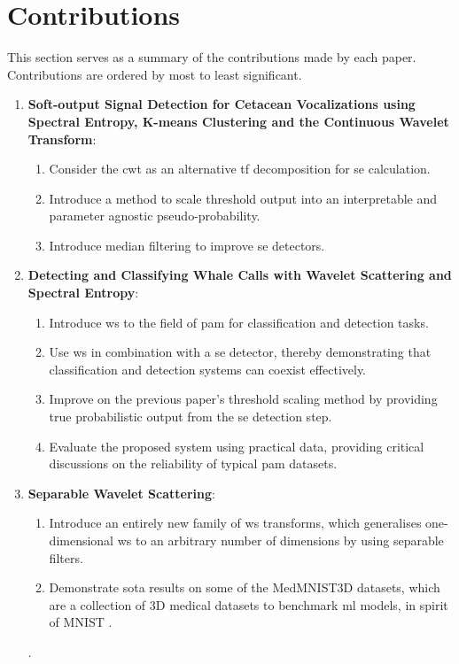\clearpage
\section{Contributions}
This section serves as a summary of the contributions made by each paper. Contributions are ordered by most to least significant.

\begin{enumerate}
    \item \textbf{Soft-output Signal Detection for Cetacean Vocalizations using Spectral Entropy, K-means Clustering and the Continuous Wavelet Trans\-form}:
    \begin{enumerate}
        \item Consider the \ac{cwt} as an alternative \ac{tf} decomposition for \ac{se} calculation.
        \item Introduce a method to scale threshold output into an interpretable and para\-meter agnostic pseudo-probability.
        \item Introduce median filtering to improve \ac{se} detectors.
    \end{enumerate}
    \item \textbf{Detecting and Classifying Whale Calls with Wavelet Scattering and Spec\-tral Entropy}:
    \begin{enumerate}
        \item Introduce \ac{ws} to the field of \ac{pam} for classification and detection tasks.
        \item Use \ac{ws} in combination with a \ac{se} detector, thereby demonstrating that classi\-fication and detection systems can coexist effectively.
        \item Improve on the previous paper's threshold scaling method by providing true proba\-bilistic output from the \ac{se} detection step.
        \item Evaluate the proposed system using practical data, providing critical discus\-sions on the reliability of typical \ac{pam} datasets. 
    \end{enumerate}
    \item \textbf{Separable Wavelet Scattering}: 
    \begin{enumerate}
        \item Introduce an entirely new family of \ac{ws} transforms, which generalises one-dimensional \ac{ws} to an arbitrary number of dimensions by using separable filters.
        \item Demonstrate \ac{sota} results on some of the MedMNIST3D \cite{medmnist} datasets, which are a collection of 3D medical datasets to benchmark \ac{ml} models, in spirit of MNIST \cite{mnist}.
    \end{enumerate}.
\end{enumerate}
